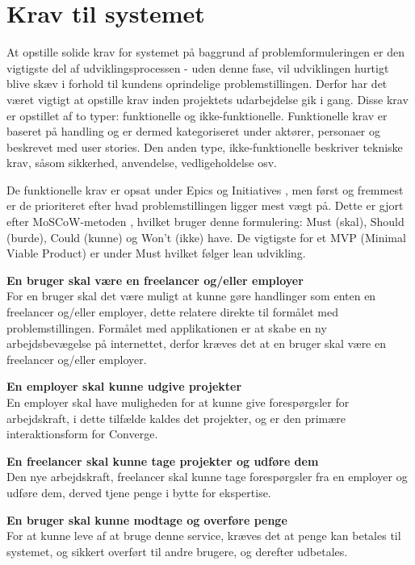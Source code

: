 \section{Krav til systemet}
\label{sec:system-requirements}

At opstille solide krav for systemet på baggrund af problemformuleringen er den vigtigste del af udviklingsprocessen - uden denne fase, vil udviklingen hurtigt blive skæv i forhold til kundens oprindelige problemstillingen. Derfor har det været vigtigt at opstille krav inden projektets udarbejdelse gik i gang. Disse krav er opstillet af to typer: funktionelle og ikke-funktionelle. Funktionelle krav er baseret på handling og er dermed kategoriseret under aktører, personaer og beskrevet med user stories. Den anden type, ikke-funktionelle beskriver tekniske krav, såsom sikkerhed, anvendelse, vedligeholdelse osv. 

De funktionelle krav er opsat under Epics og Initiatives \cite{doocumentation-kravspec}, men først og fremmest er de prioriteret efter hvad problemstillingen ligger mest vægt på. Dette er gjort efter MoSCoW-metoden \cite{doocumentation-kravspec}, hvilket bruger denne formulering: Must (skal), Should (burde), Could (kunne) og Won’t (ikke) have. De vigtigste for et MVP (Minimal Viable Product) \cite[MVP]{converge-terms} er under Must hvilket følger lean udvikling. 

\textbf{En bruger skal være en freelancer og/eller employer} \\
For en bruger skal det være muligt at kunne gøre handlinger som enten en freelancer og/eller employer, dette relatere direkte til formålet med problemstillingen. Formålet med applikationen er at skabe en ny arbejdsbevægelse på internettet, derfor kræves det at en bruger skal være en freelancer og/eller employer.

\textbf{En employer skal kunne udgive projekter} \\
En employer skal have muligheden for at kunne give forespørgsler for arbejdskraft, i dette tilfælde kaldes det projekter, og er den primære interaktionsform for Converge.

\textbf{En freelancer skal kunne tage projekter og udføre dem} \\
Den nye arbejdskraft, freelancer skal kunne tage forespørgsler fra en employer og udføre dem, derved tjene penge i bytte for ekspertise.

\textbf{En bruger skal kunne modtage og overføre penge} \\
For at kunne leve af at bruge denne service, kræves det at penge kan betales til systemet, og sikkert overført til andre brugere, og derefter udbetales.

